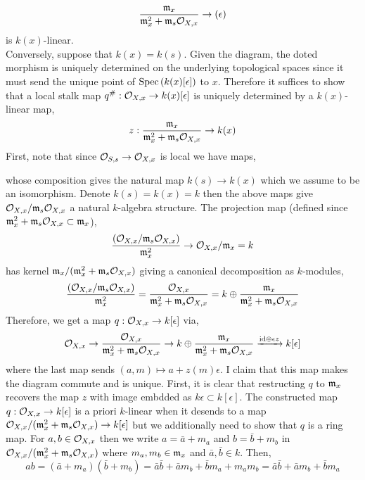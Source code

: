 \documentclass[12pt]{article}
\begin{document}
\[ \frac{\mathfrak{m}_x}{\mathfrak{m}_x^2 + \mathfrak{m}_s \mathcal{O}_{X, x}}  \to (\epsilon) \]
is $k(x)$-linear.
\bigskip\\
Conversely, suppose that $k(x) = k(s)$. Given the diagram, the doted morphism is uniquely determined on the underlying topological spaces since it must send the unique point of $\mathrm{Spec}\left( k(x)[\epsilon] \right)$ to $x$. Therefore it suffices to show that a local stalk map $q^\# : \mathcal{O}_{X, x} \to k(x)[\epsilon]$ is uniquely determined by a $k(x)$-linear map,
\[ z : \frac{\mathfrak{m}_x}{\mathfrak{m}_x^2 + \mathfrak{m}_s \mathcal{O}_{X, x}} \to k(x) \]
First, note that since $\mathcal{O}_{S, s} \to \mathcal{O}_{X, x}$ is local we have maps,
\begin{center}
\end{center}
whose composition gives the natural map $k(s) \to k(x)$ which we assume to be an isomorphism. Denote $k(s) = k(x) = k$ then the above maps give $\mathcal{O}_{X, x} / \mathfrak{m}_s \mathcal{O}_{X, x}$ a natural $k$-algebra structure. The projection map (defined since $\mathfrak{m}_x^2 + \mathfrak{m}_s \mathcal{O}_{X, x} \subset \mathfrak{m}_x$),
\[ \frac{(\mathcal{O}_{X, x} / \mathfrak{m}_s \mathcal{O}_{X, x})}{\mathfrak{m}_x^2} \to \mathcal{O}_{X, x} / \mathfrak{m}_x = k \]
has kernel $\mathfrak{m}_x /(\mathfrak{m}_x^2 + \mathfrak{m}_s \mathcal{O}_{X, x})$ giving a canonical decomposition as $k$-modules,
\[ \frac{(\mathcal{O}_{X, x} / \mathfrak{m}_s \mathcal{O}_{X, x})}{\mathfrak{m}_x^2} = \frac{\mathcal{O}_{X, x}}{\mathfrak{m}_x^2 + \mathfrak{m}_s \mathcal{O}_{X, x}} = k \oplus \frac{\mathfrak{m}_x}{\mathfrak{m}_x^2 + \mathfrak{m}_s \mathcal{O}_{X, x}} \]
Therefore, we get a map $q : \mathcal{O}_{X, x} \to k[\epsilon]$ via,
\[ \mathcal{O}_{X, x} \to \frac{\mathcal{O}_{X, x}}{\mathfrak{m}_x^2 + \mathfrak{m}_s \mathcal{O}_{X, x}} \to k \oplus \frac{\mathfrak{m}_x}{\mathfrak{m}_x^2 + \mathfrak{m}_s \mathcal{O}_{X, x}} \xrightarrow{\mathrm{id} \oplus \epsilon z} k[\epsilon] \]
where the last map sends $(a, m) \mapsto a + z(m) \epsilon$. I claim that this map makes the diagram commute and is unique. First, it is clear that restructing $q$ to $\mathfrak{m}_x$ recovers the map $z$ with image embdded as $k \epsilon \subset k[\epsilon]$. The constructed map $q : \mathcal{O}_{X, x} \to k[\epsilon]$ is a priori $k$-linear when it desends to a map $\mathcal{O}_{X, x} / (\mathfrak{m}_x^2 + \mathfrak{m}_s \mathcal{O}_{X, x}) \to k[\epsilon]$ but we additionally need to show that $q$ is a ring map. For $a,b \in \mathcal{O}_{X, x}$ then we write $a = \bar{a} + m_a$ and $b = \bar{b} + m_b$ in $\mathcal{O}_{X, x} / (\mathfrak{m}_x^2 + \mathfrak{m}_s \mathcal{O}_{X, x})$ where $m_a, m_b \in \mathfrak{m}_x$ and $\bar{a}, \bar{b} \in k$. Then,
\[ ab = (\bar{a} + m_a) (\bar{b} + m_b) = \bar{a} \bar{b} + \bar{a} m_b + \bar{b} m_a + m_a m_b = \bar{a} \bar{b} + \bar{a} m_b + \bar{b} m_a \]
\end{document}
